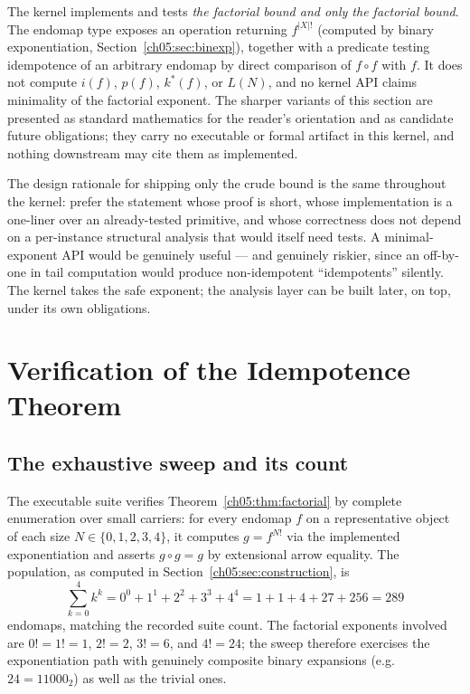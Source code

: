 \begin{finding}
\label{ch05:find:implemented}
The kernel implements and tests \emph{the factorial bound and only the
factorial bound}. The endomap type exposes an operation returning
$f^{|X|!}$ (computed by binary exponentiation,
Section~\ref{ch05:sec:binexp}), together with a predicate testing
idempotence of an arbitrary endomap by direct comparison of $f \circ f$
with $f$. It does not compute $i(f)$, $p(f)$, $k^{*}(f)$, or $L(N)$, and
no kernel API claims minimality of the factorial exponent. The sharper
variants of this section are presented as standard mathematics
\cite{pin, howie} for the reader's orientation and as candidate future
obligations; they carry no executable or formal artifact in this kernel,
and nothing downstream may cite them as implemented.
\end{finding}

The design rationale for shipping only the crude bound is the same
throughout the kernel: prefer the statement whose proof is short, whose
implementation is a one-liner over an already-tested primitive, and whose
correctness does not depend on a per-instance structural analysis that
would itself need tests. A minimal-exponent API would be genuinely useful
--- and genuinely riskier, since an off-by-one in tail computation would
produce non-idempotent ``idempotents'' silently. The kernel takes the safe
exponent; the analysis layer can be built later, on top, under its own
obligations.

\section{Verification of the Idempotence Theorem}
\label{ch05:sec:evidence}

\subsection{The exhaustive sweep and its count}

The executable suite verifies Theorem~\ref{ch05:thm:factorial} by complete
enumeration over small carriers: for every endomap $f$ on a representative
object of each size $N \in \{0, 1, 2, 3, 4\}$, it computes
$g = f^{N!}$ via the implemented exponentiation and asserts
$g \circ g = g$ by extensional arrow equality. The population, as computed
in Section~\ref{ch05:sec:construction}, is
\[
  \sum_{k=0}^{4} k^{k}
  = 0^{0} + 1^{1} + 2^{2} + 3^{3} + 4^{4}
  = 1 + 1 + 4 + 27 + 256
  = 289
\]
endomaps, matching the recorded suite count. The factorial exponents
involved are $0! = 1! = 1$, $2! = 2$, $3! = 6$, and $4! = 24$; the sweep
therefore exercises the exponentiation path with genuinely composite
binary expansions (e.g.\ $24 = 11000_2$) as well as the trivial ones.

